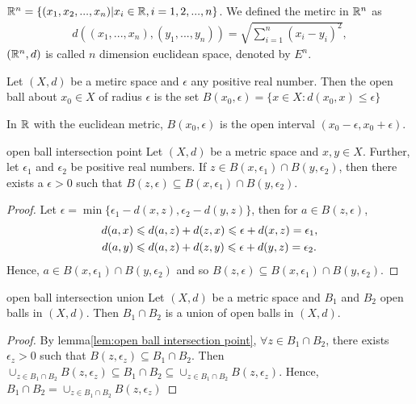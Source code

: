 \begin{example}{}{}
    $\mathbb{R}^n=\{(x_1,x_2,...,x_n)|x_i\in \mathbb{R},i=1,2,...,n\}$. We defined the metirc in $\mathbb{R}^n$ as
    \begin{align*}
        d((x_1,...,x_n),(y_1,...,y_n)) = \sqrt{\sum\limits_{i=1}^{n}(x_i-y_i)^2}, 
    \end{align*}
    $(\mathbb{R}^n,d)$ is called $n$ dimension euclidean space, denoted by $E^n$.
\end{example}

\begin{definition}{}{}
    Let $(X,d)$ be a metirc space and $\epsilon$ any positive real number. Then the open ball about $x_0\in X$ of radius $\epsilon$ is the set
    $B(x_0,\epsilon)=\{x\in X:d(x_0,x)\leq\epsilon\}$
\end{definition}

\begin{example}{}{}
    In $\mathbb{R}$ with the euclidean metric, $B(x_0,\epsilon)$ is the open interval $(x_0-\epsilon, x_0+\epsilon)$.
\end{example}

\begin{lemma}{}{open ball intersection point}
    Let $(X,d)$ be a metric space and $x,y\in X$.
    Further, let $\epsilon_1$ and $\epsilon_2$ be positive real numbers. 
    If $z\in B(x,\epsilon_1)\cap B(y,\epsilon_2)$, 
    then there exists a $\epsilon>0$ such that $B(z,\epsilon)\subseteq B(x,\epsilon_1)\cap B(y,\epsilon_2)$.
\end{lemma}

\begin{proof}
    Let $\epsilon = \min\{\epsilon_1-d(x,z),\epsilon_2-d(y,z)\}$, then for $a\in B(z,\epsilon)$,
    \begin{align*}
        d(a,x)&\leqslant d(a,z)+d(z,x)\leqslant \epsilon + d(x,z)= \epsilon_1,\\
        d(a,y)&\leqslant d(a,z)+d(z,y)\leqslant \epsilon + d(y,z)= \epsilon_2.
    \end{align*}
    Hence, $a\in B(x,\epsilon_1)\cap B(y,\epsilon_2)$ and so $B(z,\epsilon)\subseteq B(x,\epsilon_1)\cap B(y,\epsilon_2)$.
\end{proof}

\begin{corollary}{}{open ball intersection union}
    Let $(X,d)$ be a metric space and $B_1$ and $B_2$ open balls in $(X,d)$. Then
    $B_1\cap B_2$ is a union of open balls in $(X,d)$.
\end{corollary}
\begin{proof}
    By lemma\ref{lem:open ball intersection point}, $\forall z\in B_1\cap B_2$, 
    there exists $\epsilon_z>0$ such that $B(z,\epsilon_z)\subseteq B_1\cap B_2$. Then
    $\cup_{z\in B_1\cap B_2} B(z,\epsilon_{z})\subseteq B_1\cap B_2\subseteq \cup_{z\in B_1\cap B_2} B(z,\epsilon_{z})$. 
    Hence, $B_1\cap B_2 = \cup_{z\in B_1\cap B_2} B(z,\epsilon_{z})$
\end{proof}


